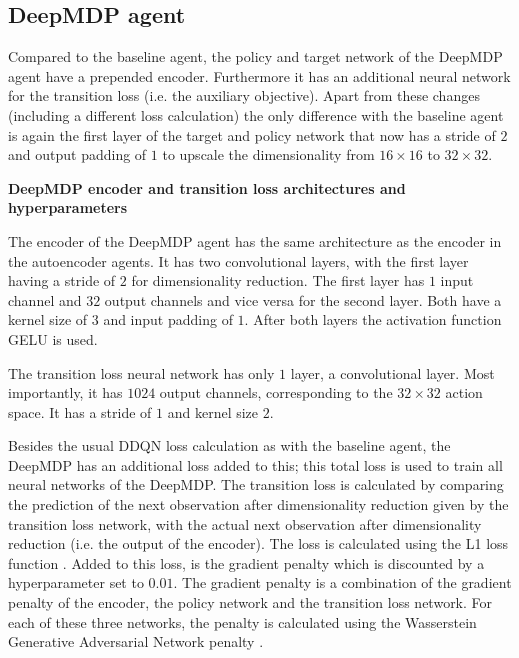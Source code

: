 \subsection{DeepMDP agent}
Compared to the baseline agent, the policy and target network of the DeepMDP agent have a prepended encoder. Furthermore it has an additional neural network for the transition loss (i.e. the auxiliary objective). Apart from these changes (including a different loss calculation) the only difference with the baseline agent is again the first layer of the target and policy network that now has a stride of $2$ and output padding of $1$ to upscale the dimensionality from $16 \times 16$ to $32 \times 32$.\newline \par

\noindent \textbf{DeepMDP encoder and transition loss architectures and hyperparameters} \par
\noindent The encoder of the DeepMDP agent has the same architecture as the encoder in the autoencoder agents. It has two convolutional layers, with the first layer having a stride of $2$ for dimensionality reduction. The first layer has $1$ input channel and $32$ output channels and vice versa for the second layer. Both have a kernel size of $3$ and input padding of $1$. After both layers the activation function GELU is used.

The transition loss neural network has only $1$ layer, a convolutional layer. Most importantly, it has $1024$ output channels, corresponding to the $32 \times 32$ action space. It has a stride of $1$ and kernel size $2$.

Besides the usual DDQN loss calculation as with the baseline agent, the DeepMDP has an additional loss added to this; this total loss is used to train all neural networks of the DeepMDP. The transition loss is calculated by comparing the prediction of the next observation after dimensionality reduction given by the transition loss network, with the actual next observation after dimensionality reduction (i.e. the output of the encoder). The loss is calculated using the L1 loss function \cite{l1}. Added to this loss, is the gradient penalty which is discounted by a hyperparameter set to $0.01$. The gradient penalty is a combination of the gradient penalty of the encoder, the policy network and the transition loss network. For each of these three networks, the penalty is calculated using the Wasserstein Generative Adversarial Network penalty \cite{wgan}.


